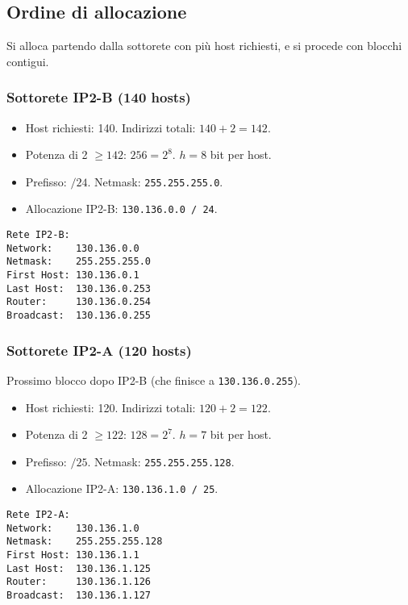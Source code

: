 \documentclass{article}
\begin{document}
\subsection{Ordine di allocazione}
Si alloca partendo dalla sottorete con più host richiesti, e si procede con blocchi contigui.

\subsubsection{Sottorete IP2-B (140 hosts)}
\begin{itemize}
    \item Host richiesti: 140. Indirizzi totali: $140 + 2 = 142$.
    \item Potenza di 2 $\geq 142$: $256 = 2^8$. $h=8$ bit per host.
    \item Prefisso: $/24$. Netmask: \texttt{255.255.255.0}.
    \item Allocazione IP2-B: \texttt{130.136.0.0 / 24}.
\end{itemize}
\begin{verbatim}
Rete IP2-B:
Network:    130.136.0.0
Netmask:    255.255.255.0
First Host: 130.136.0.1
Last Host:  130.136.0.253
Router:     130.136.0.254
Broadcast:  130.136.0.255
\end{verbatim}

\subsubsection{Sottorete IP2-A (120 hosts)}
Prossimo blocco dopo IP2-B (che finisce a \texttt{130.136.0.255}).
\begin{itemize}
    \item Host richiesti: 120. Indirizzi totali: $120 + 2 = 122$.
    \item Potenza di 2 $\geq 122$: $128 = 2^7$. $h=7$ bit per host.
    \item Prefisso: $/25$. Netmask: \texttt{255.255.255.128}.
    \item Allocazione IP2-A: \texttt{130.136.1.0 / 25}.
\end{itemize}
\begin{verbatim}
Rete IP2-A:
Network:    130.136.1.0
Netmask:    255.255.255.128
First Host: 130.136.1.1
Last Host:  130.136.1.125
Router:     130.136.1.126
Broadcast:  130.136.1.127
\end{verbatim}
\end{document}
